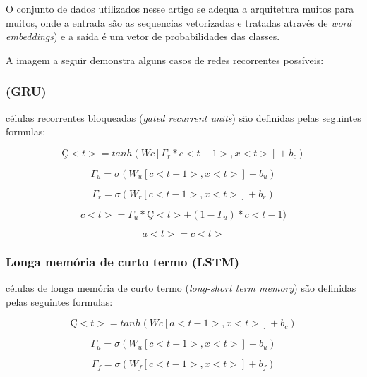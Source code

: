 \documentclass[12pt]{article}
\begin{document}
O conjunto de dados utilizados nesse artigo se adequa a arquitetura muitos para muitos, onde a entrada são as sequencias vetorizadas e tratadas através de \textit{word embeddings}) e a saída é um vetor de probabilidades das classes.

A imagem a seguir demonstra alguns casos de redes recorrentes possíveis:

\subsubsection{(GRU)}
células recorrentes bloqueadas (\textit{gated recurrent units}) são definidas pelas seguintes formulas:

\begin{equation}
    Ç<t> = tanh(Wc[\Gamma_r * c<t-1>, x<t>]+b_c)
\end{equation}

\begin{equation}
    \Gamma_u = \sigma(W_u[c<t-1>, x<t>]+b_u)
\end{equation}

\begin{equation}
    \Gamma_r = \sigma(W_r[c<t-1>, x<t>]+b_r)
\end{equation}

\begin{equation}
    c<t>=\Gamma_u*Ç<t>+(1-\Gamma_u)*c<t-1)
\end{equation}

\begin{equation}
    a<t>=c<t>
\end{equation}

\subsubsection{Longa memória de curto termo (LSTM)}

células de longa memória de curto termo (\textit{long-short term memory}) são definidas pelas seguintes formulas:

\begin{equation}
    Ç<t> = tanh(Wc[a<t-1>, x<t>]+b_c)
\end{equation}

\begin{equation}
    \Gamma_u = \sigma(W_u[c<t-1>, x<t>]+b_u)
\end{equation}

\begin{equation}
    \Gamma_f = \sigma(W_f[c<t-1>, x<t>]+b_f)
\end{equation}
\end{document}
